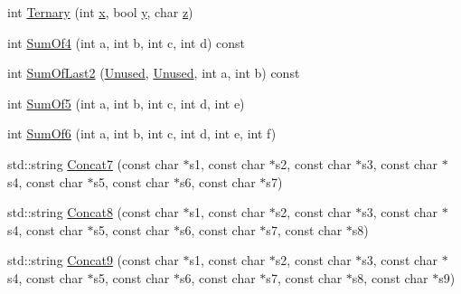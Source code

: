 \begin{DoxyCompactItemize}
\item 
int \mbox{\hyperlink{classtesting_1_1gmock__more__actions__test_1_1_foo_afc5b86988210ad598fa3a2a9822297e4}{Ternary}} (int \mbox{\hyperlink{_obj__test_2lib_2googletest-master_2googlemock_2test_2gmock-matchers__test_8cc_a6150e0515f7202e2fb518f7206ed97dc}{x}}, bool \mbox{\hyperlink{_obj__test_2lib_2googletest-master_2googlemock_2test_2gmock-matchers__test_8cc_a39cb44155237f0205e0feb931d5acbed}{y}}, char \mbox{\hyperlink{_obj__test_2lib_2googletest-master_2googlemock_2test_2gmock-matchers__test_8cc_a196ff6a287f53f758b1506f21269fc77}{z}})
\item 
int \mbox{\hyperlink{classtesting_1_1gmock__more__actions__test_1_1_foo_a69ca68e84528904032bad9533a23fb0a}{Sum\+Of4}} (int a, int b, int c, int d) const
\item 
int \mbox{\hyperlink{classtesting_1_1gmock__more__actions__test_1_1_foo_abc041eb7a8e8211656495f2540f315ec}{Sum\+Of\+Last2}} (\mbox{\hyperlink{namespacetesting_a603e329ec0263ebfcf16f712810bd511}{Unused}}, \mbox{\hyperlink{namespacetesting_a603e329ec0263ebfcf16f712810bd511}{Unused}}, int a, int b) const
\item 
int \mbox{\hyperlink{classtesting_1_1gmock__more__actions__test_1_1_foo_a55fb0cdc224c450f401e0fea4f979512}{Sum\+Of5}} (int a, int b, int c, int d, int e)
\item 
int \mbox{\hyperlink{classtesting_1_1gmock__more__actions__test_1_1_foo_a34b5ae7cd4620331af92c637e3534bc4}{Sum\+Of6}} (int a, int b, int c, int d, int e, int f)
\item 
std\+::string \mbox{\hyperlink{classtesting_1_1gmock__more__actions__test_1_1_foo_a5ff9313371e65a91b086afdc2032b0eb}{Concat7}} (const char $\ast$s1, const char $\ast$s2, const char $\ast$s3, const char $\ast$s4, const char $\ast$s5, const char $\ast$s6, const char $\ast$s7)
\item 
std\+::string \mbox{\hyperlink{classtesting_1_1gmock__more__actions__test_1_1_foo_a25b91cea8633d026fe3f4a36c1574b8e}{Concat8}} (const char $\ast$s1, const char $\ast$s2, const char $\ast$s3, const char $\ast$s4, const char $\ast$s5, const char $\ast$s6, const char $\ast$s7, const char $\ast$s8)
\item 
std\+::string \mbox{\hyperlink{classtesting_1_1gmock__more__actions__test_1_1_foo_a8f5b145b0cd23055630b2f9d10b3f45b}{Concat9}} (const char $\ast$s1, const char $\ast$s2, const char $\ast$s3, const char $\ast$s4, const char $\ast$s5, const char $\ast$s6, const char $\ast$s7, const char $\ast$s8, const char $\ast$s9)
\item 

\end{DoxyCompactItemize}
